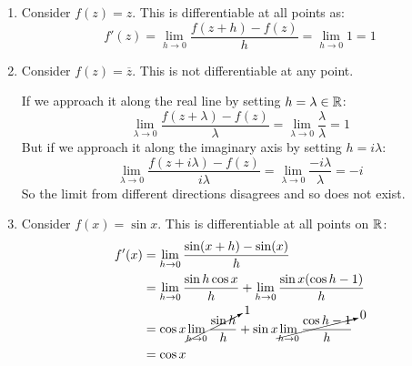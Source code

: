 \documentclass[../main.tex]{subfiles}
\begin{document}
\begin{example}
  \begin{enumerate}
    \item Consider $f(z) = z$.
      This is differentiable at all points as:
      \[
        f'(z) = \lim_{h \to 0} \frac{f(z + h) - f(z)}{h} = \lim_{h \to 0} 1 =1
      \]
    \item Consider $f(z) = \overline{z}$.
      This is not differentiable at any point.

      If we approach it along the real line by setting $h = \lambda \in \mathbb{R}$:
      \[
        \lim_{\lambda \to 0} \frac{f(z + \lambda) - f(z)}{\lambda} = \lim_{\lambda \to 0} \frac{\lambda}{\lambda} = 1
      \]
      But if we approach it along the imaginary axis by setting $h = i\lambda$:
      \[
        \lim_{\lambda \to 0} \frac{f(z + i\lambda) - f(z)}{i\lambda} = \lim_{\lambda \to 0} \frac{-i\lambda}{\lambda} = -i
      \]
      So the limit from different directions disagrees and so does not exist.
    \item Consider $f(x) = \sin x$. This is differentiable at all points on $\mathbb{R}$:
      \begin{align*}
        f'(x) &= \lim_{h \to 0} \frac{\sin(x + h) - \sin(x)}{h} \\
              &= \lim_{h \to 0} \frac{\sin h\cos x}{h} + \lim_{h \to 0} \frac{\sin x (\cos h - 1)}{h} \\
              &= \cos x \cancelto{1}{\lim_{h \to 0} \frac{\sin h}{h}} + \sin x \cancelto{0}{\lim_{h \to 0} \frac{\cos h - 1}{h}} \\
              &= \cos x
      \end{align*}
  \end{enumerate}
\end{example}
\end{document}

